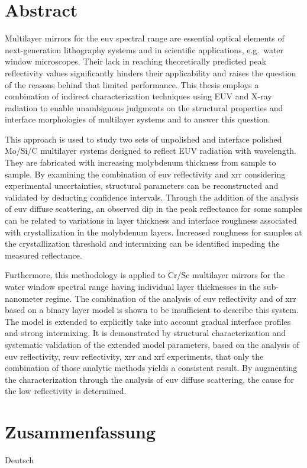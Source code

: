 \section*{Abstract}

\thispagestyle{empty}

    Multilayer mirrors for the \glsdesc{euv} spectral range are essential optical elements of next-generation lithography systems and in scientific applications, e.g.~water window microscopes. Their lack in reaching theoretically predicted peak reflectivity values significantly hinders their applicability and raises the question of the reasons behind that limited performance. This thesis employs a combination of indirect characterization techniques using EUV and X-ray radiation to enable unambiguous judgments on the structural properties and interface morphologies of multilayer systems and to answer this question.
    
    This approach is used to study two sets of unpolished and interface polished Mo/Si/C multilayer systems designed to reflect EUV radiation with  wavelength. They are fabricated with increasing molybdenum thickness from sample to sample. By examining the combination of \glsdesc{euv} reflectivity and \glsdesc{xrr} considering experimental uncertainties, structural parameters can be reconstructed and validated by deducting confidence intervals. Through the addition of the analysis of \glsdesc{euv} diffuse scattering, an observed dip in the peak reflectance for some samples can be related to variations in layer thickness and interface roughness associated with crystallization in the molybdenum layers. Increased roughness for samples at the crystallization threshold and intermixing can be identified impeding the measured reflectance.
    
    Furthermore, this methodology is applied to Cr/Sc multilayer mirrors for the water window spectral range having individual layer thicknesses in the sub-nanometer regime. The combination of the analysis of \glsdesc{euv} reflectivity and of \glsdesc{xrr} based on a binary layer model is shown to be insufficient to describe this system. The model is extended to explicitly take into account gradual interface profiles and strong intermixing. It is demonstrated by structural characterization and systematic validation of the extended model parameters, based on the analysis of \glsdesc{euv} reflectivity, \glsdesc{reuv} reflectivity, \glsdesc{xrr} and \glsdesc{xrf} experiments, that only the combination of those analytic methods yields a consistent result. By augmenting the characterization through the analysis of \glsdesc{euv} diffuse scattering, the cause for the low reflectivity is determined.

\cleardoublepage

\thispagestyle{empty}

\section*{Zusammenfassung}
    
    Deutsch

\cleardoublepage
